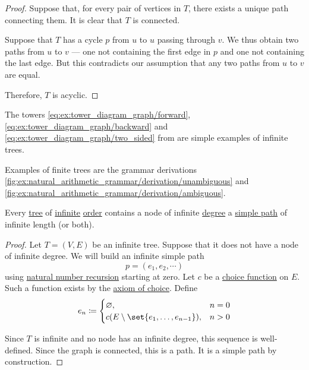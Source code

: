 \begin{proof}
   Suppose that, for every pair of vertices in \( T \), there exists a unique path connecting them. It is clear that \( T \) is connected.

  Suppose that \( T \) has a cycle \( p \) from \( u \) to \( u \) passing through \( v \). We thus obtain two paths from \( u \) to \( v \) --- one not containing the first edge in \( p \) and one not containing the last edge. But this contradicts our assumption that any two paths from \( u \) to \( v \) are equal.

  Therefore, \( T \) is acyclic.
\end{proof}

\begin{example}\label{ex:def:tree}
  The towers \eqref{eq:ex:tower_diagram_graph/forward}, \eqref{eq:ex:tower_diagram_graph/backward} and \eqref{eq:ex:tower_diagram_graph/two_sided} from  are simple examples of infinite trees.

  Examples of finite trees are the grammar derivations \cref{fig:ex:natural_arithmetic_grammar/derivation/unambiguous} and \cref{fig:ex:natural_arithmetic_grammar/derivation/ambiguous}.
\end{example}

\begin{theorem}\label{thm:konigs_lemma}
  Every \hyperref[def:tree]{tree} of \hyperref[def:graph/order]{infinite} \hyperref[def:graph/order]{order} contains a node of infinite \hyperref[def:graph_incidence/degree]{degree} a \hyperref[def:graph_adjancency_chain/simple]{simple path} of infinite length (or both).
\end{theorem}
\begin{proof}
  Let \( T = (V, E) \) be an infinite tree. Suppose that it does not have a node of infinite degree. We will build an infinite simple path
  \begin{equation*}
    p = (e_1, e_2, \cdots)
  \end{equation*}
  using \hyperref[rem:natural_number_recursion]{natural number recursion} starting at zero. Let \( c \) be a \hyperref[def:choice_function]{choice function} on \( E \). Such a function exists by the \hyperref[def:zfc/choice]{axiom of choice}. Define
  \begin{equation*}
    e_n \coloneqq \begin{cases}
      \varnothing,                                 &n = 0 \\
      c(E \setminus \set{ e_1, \ldots, e_{n-1} }), &n > 0
    \end{cases}
  \end{equation*}

  Since \( T \) is infinite and no node has an infinite degree, this sequence is well-defined. Since the graph is connected, this is a path. It is a simple path by construction.
\end{proof}

